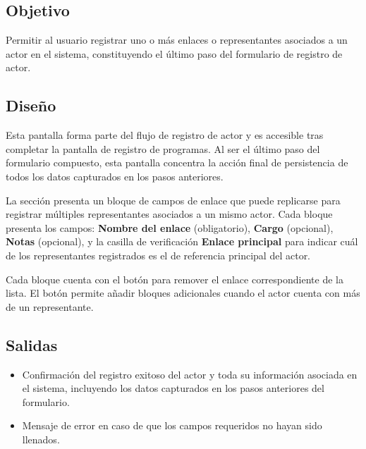 \subsection{Objetivo}
Permitir al usuario registrar uno o más enlaces o representantes asociados a un 
actor en el sistema, constituyendo el último paso del formulario de registro de 
actor.

\subsection{Diseño}
Esta pantalla  forma parte del flujo de registro de actor y es accesible tras completar 
la pantalla de registro de programas. Al ser el último paso del formulario 
compuesto, esta pantalla concentra la acción final de persistencia de todos los 
datos capturados en los pasos anteriores.

La sección presenta un bloque de campos de enlace que puede replicarse para 
registrar múltiples representantes asociados a un mismo actor. Cada bloque 
presenta los campos: \textbf{Nombre del enlace} (obligatorio), \textbf{Cargo} 
(opcional), \textbf{Notas} (opcional), y la casilla de verificación 
\textbf{Enlace principal} para indicar cuál de los representantes registrados 
es el de referencia principal del actor.

Cada bloque cuenta con el botón  para remover el enlace 
correspondiente de la lista. El botón  permite añadir 
bloques adicionales cuando el actor cuenta con más de un representante.


\subsection{Salidas}
\begin{itemize}
	\item Confirmación del registro exitoso del actor y toda su información 
	asociada en el sistema, incluyendo los datos capturados en los pasos 
	anteriores del formulario.
	\item Mensaje de error  en 
	caso de que los campos requeridos no hayan sido llenados.
\end{itemize}

